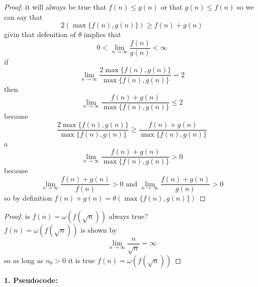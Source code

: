 \documentclass[11pt]{article}
\begin{document}
	\begin{proof}
		it will always be true that $f(n) \leq g(n)$ or that $g(n) \leq f(n)$
		so we can say that  
		$$2(\max\{f(n),g(n)\}) \geq f(n) + g(n)$$
		givin that defenition of $\theta$ implies that 
		$$0 < \lim_{n \to \infty} \frac {f(n)}{g(n)} < \infty $$
		if
		$$\lim_{n \to \infty}\frac{2\max\{f(n),g(n)\}}{\max\{f(n), g(n)\}} = 2$$
		then
		$$\lim_{n \to \infty}\frac{f(n) + g(n)}{\max\{f(n), g(n)\}} \leq 2$$
		because
		$$\frac{2\max\{f(n),g(n)\}}{\max\{f(n),g(n)\}} \geq \frac{f(n) + g(n)}{\max\{f(n),g(n)\}}$$
		a
		$$\lim_{n \to \infty} \frac{f(n) + g(n)}{\max\{f(n), g(n)\}} > 0 $$
		because
		$$\lim_{n \to \infty} \frac{f(n) + g(n)}{f(n)} > 0 \textrm{ and } \lim_{n \to \ \infty} \frac{f(n) + g(n)}{g(n)} > 0$$
		so by definition $f(n) + g(n) = \theta(\max\{f(n), g(n)\})$
	
	\end{proof}
	
	\bigskip
	
	
	\begin{proof}
		is $f(n)=\omega(f(\sqrt{n}))$ always true?\\
		$f(n)= \omega(f(\sqrt{n}))$ is shown by
		$$\displaystyle \lim_{n \to \infty}\frac{n}{\sqrt{n}} = \infty$$
		so as long as $n_0 > 0$ it is true $f(n) = \omega(f(\sqrt{n}))$
	
	\end{proof}
	
	\newpage
	
	
	{\bf 1. Pseudocode:}
	
\end{document}
